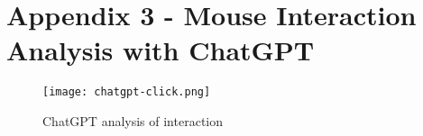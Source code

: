 \chapter*{Appendix 3 - Mouse Interaction Analysis with ChatGPT}
\label{chap:chatgpt-mouse}

\begin{figure}[h]
    \centering
    \texttt{[image: chatgpt-click.png]}
    \caption[ChatGPT analysis of interaction]{ChatGPT analysis of interaction}
    \label{fig:chatgpt-click}
\end{figure}